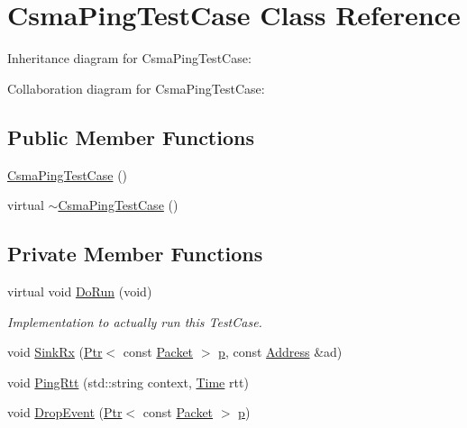 \hypertarget{classCsmaPingTestCase}{}\section{Csma\+Ping\+Test\+Case Class Reference}
\label{classCsmaPingTestCase}


Inheritance diagram for Csma\+Ping\+Test\+Case\+:


Collaboration diagram for Csma\+Ping\+Test\+Case\+:
\subsection*{Public Member Functions}
\begin{DoxyCompactItemize}
\item 
\hyperlink{classCsmaPingTestCase_a95beafc2f61854f668c4a344d7ba48bb}{Csma\+Ping\+Test\+Case} ()
\item 
virtual \hyperlink{classCsmaPingTestCase_a742406d1f6cc1f03fafa98f7019b1400}{$\sim$\+Csma\+Ping\+Test\+Case} ()
\end{DoxyCompactItemize}
\subsection*{Private Member Functions}
\begin{DoxyCompactItemize}
\item 
virtual void \hyperlink{classCsmaPingTestCase_a975ad130eac1dcf501124552e1bc4e2c}{Do\+Run} (void)
\begin{DoxyCompactList}\small\item\em Implementation to actually run this Test\+Case. \end{DoxyCompactList}\item 
void \hyperlink{classCsmaPingTestCase_ac537bf5fee6173f5026b9a1c604008db}{Sink\+Rx} (\hyperlink{classns3_1_1Ptr}{Ptr}$<$ const \hyperlink{classns3_1_1Packet}{Packet} $>$ \hyperlink{lte__link__budget__x2__handover__measures_8m_ac9de518908a968428863f829398a4e62}{p}, const \hyperlink{classns3_1_1Address}{Address} \&ad)
\item 
void \hyperlink{classCsmaPingTestCase_a1fba5d18722337de829fb4e7b5aa9ecb}{Ping\+Rtt} (std\+::string context, \hyperlink{classns3_1_1Time}{Time} rtt)
\item 
void \hyperlink{classCsmaPingTestCase_ac0424cf5af390940bf7de1557ce1ffb1}{Drop\+Event} (\hyperlink{classns3_1_1Ptr}{Ptr}$<$ const \hyperlink{classns3_1_1Packet}{Packet} $>$ \hyperlink{lte__link__budget__x2__handover__measures_8m_ac9de518908a968428863f829398a4e62}{p})
\end{DoxyCompactItemize}

